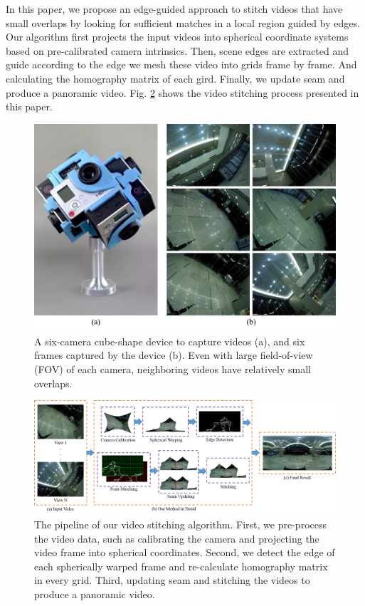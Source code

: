 \documentclass[conference]{IEEEtran}
\begin{document}
In this paper, we propose an edge-guided approach to stitch videos that have small overlaps by looking for sufficient matches in a local region guided by edges. 
%
Our algorithm first projects the input videos into spherical coordinate systems based on pre-calibrated camera intrinsics. 
Then, scene edges are extracted and guide according to the edge we mesh these video into grids frame by frame.
And calculating the homography matrix of each gird. Finally, we update seam and produce a panoramic video.
Fig. \ref{fig:res} shows the video stitching process presented in this paper.

\begin{figure}[t]
\centering
\includegraphics[scale=0.36]{picture34.png}
\caption{A six-camera cube-shape device to capture videos (a), and six frames captured by the device (b). Even with large field-of-view (FOV) of each camera, neighboring videos have relatively small overlaps. }
\label{fig:equipment}
\end{figure}

\begin{figure}
\centering
\includegraphics[scale=0.54]{picture49.png}
\caption{The pipeline of our video stitching algorithm. First, we pre-process the video data, such as calibrating the camera
and projecting the video frame into spherical coordinates. Second, we detect the edge of each spherically
warped frame and re-calculate
homography matrix in every grid. Third, updating seam and stitching the videos to produce a panoramic video.}
\label{fig:res}
\end{figure}
\end{document}
